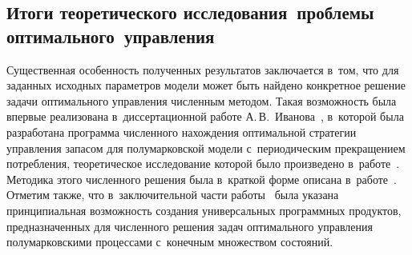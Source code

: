 \begin{multicols}{2}
\vspace*{-6pt}


\section{Итоги теоретического исследования~проблемы 
оптимального~управления}

   Существенная особенность полученных результатов заключается в~том, что 
для заданных исходных па\-ра\-мет\-ров модели может быть найдено 
конкретное решение задачи оптимального управ\-ле\-ния чис\-лен\-ным 
методом. Такая воз\-мож\-ность была впервые реализована в~диссертационной 
работе А.\,В.~Ива\-но\-ва~\cite{10-sh}, в~которой была разработана программа  
чис\-лен\-но\-го на\-хож\-де\-ния оптимальной стратегии управ\-ле\-ния запасом для 
полумарковской модели с~периодическим пре\-кра\-ще\-ни\-ем по\-треб\-ле\-ния, 
тео\-ре\-ти\-че\-ское исследование которой было произведено в~работе~\cite{7-sh}. 
Методика этого чис\-лен\-но\-го решения была в~крат\-кой форме описана 
в~работе~\cite{11-sh}. Отметим так\-же, что в~за\-клю\-чи\-тель\-ной час\-ти 
работы~\cite{9-sh} была указана принципиальная воз\-мож\-ность со\-зда\-ния 
универсальных программных продуктов, пред\-на\-зна\-чен\-ных для чис\-лен\-но\-го 
решения задач оптимального управ\-ле\-ния полумарковскими процессами 
с~конечным множеством со\-сто\-яний. 

\vspace*{-6pt}
  

\end{multicols}

